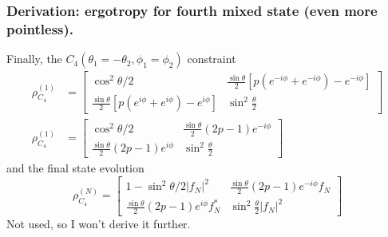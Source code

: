 \documentclass[../../../main.tex]{subfiles}
\begin{document}
\subsubsection{Derivation: ergotropy for fourth mixed state (even more pointless).}
Finally, the $C_4(\theta_1=-\theta_2,\phi_1=\phi_2)$ constraint
\begin{align*}
  \rho^{(1)}_{C_4}  & =
  \begin{bmatrix}
    \cos ^2 \theta/2                                                             & \frac{\sin \theta  }{2} \left[p(e^{-i\phi}+e^{-i\phi}) - e^{-i\phi}  \right] \\
    \frac{\sin \theta  }{2} \left[p(e^{i\phi} + e^{i\phi} ) - e^{i\phi}  \right] & \sin ^2 \frac{\theta  }{2}
  \end{bmatrix} \\
  \rho ^{(1)}_{C_4} & =
  \begin{bmatrix}
    \cos ^2 \theta/2                        & \frac{\sin \theta}{2}(2p-1) e^{-i\phi} \\
    \frac{\sin \theta  }{2} (2p-1)e^{i\phi} & \sin ^2 \frac{\theta  }{2}
  \end{bmatrix}
\end{align*}
and the final state evolution
\begin{equation*}
  \rho ^{(N)}_{C_4} =
  \begin{bmatrix}
    1- \sin^2 \theta/2|f_N|^2 & \frac{\sin \theta}{2}(2p-1) e^{-i\phi}f_N \\ \frac{\sin \theta  }{2} (2p-1)e^{i\phi}f_N ^*&  \sin ^2 \frac{\theta  }{2}|f_N|^2
  \end{bmatrix}
\end{equation*}
Not used, so I won't derive it further.
\end{document}
